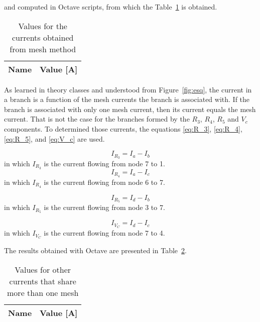and computed in Octave scripts, from which the Table~\ref{tab:op1} is obtained.

\begin{table}[h]
  \centering
  \begin{tabular}{|l|r|}
    \hline    
    {\bf Name} & {\bf Value [A]} \\ \hline
    
  \end{tabular}
  \caption{Values for the currents obtained from mesh method}
  \label{tab:op1}
\end{table}

As learned in theory classes and understood from Figure~\ref{fig:esq}, the current in a branch is a function of the mesh currents the branch is associated with. If the branch is associated with only one mesh current, then its current equals the mesh current. That is not the case for the branches formed by the $R_3$, $R_4$, $R_5$ and $V_c$ components. To determined those currents, the equations \ref{eq:R_3}, \ref{eq:R_4}, \ref{eq:R_5}, and \ref{eq:V_c} are used.

\begin{equation}
  I_{R_3}=I_a-I_b
  \label{eq:R_3}
\end{equation}
in which $I_{R_3}$ is the current flowing from node 7 to 1.
\begin{equation}
  I_{R_4}=I_a-I_c
  \label{eq:R_4}
\end{equation}
in which $I_{R_4}$ is the current flowing from node 6 to 7.

\begin{equation}
  I_{R_5}=I_d-I_b
  \label{eq:R_5}
\end{equation}
in which $I_{R_5}$ is the current flowing from node 3 to 7.

\begin{equation}
  I_{V_C}=I_d-I_c
  \label{eq:V_c}
\end{equation}
in which $I_{V_C}$ is the current flowing from node 7 to 4.

The results obtained with Octave are presented in Table~\ref{tab:op2}.

\begin{table}[h]
  \centering
  \begin{tabular}{|l|r|}
    \hline    
    {\bf Name} & {\bf Value [A]} \\ \hline
    
  \end{tabular}
  \caption{Values for other currents that share more than one mesh}
  \label{tab:op2}
\end{table}



